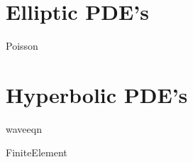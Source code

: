 \documentclass[nociteref]{SIAM-GH-book}
\begin{document}
% 
% 
% 
% 
% 
% 
% 

\part{Elliptic PDE's}
 {Poisson}


\part{Hyperbolic PDE's}
{waveeqn}

{FiniteElement}

% 
% 
% 
% 
% 
% 
\end{document}
